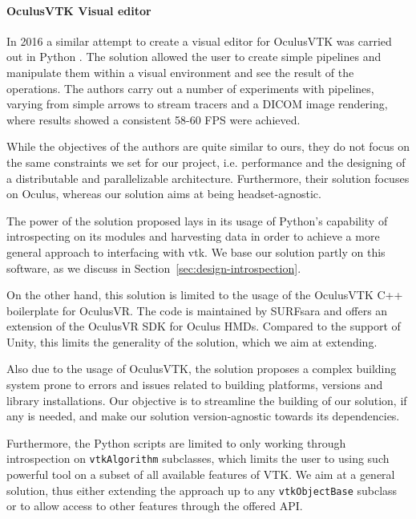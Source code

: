 \paragraph{OculusVTK Visual editor}

In 2016 a similar attempt to create a visual editor for OculusVTK was carried out in Python \cite{dreuning_visual_2016}. The solution allowed the user to create simple pipelines and manipulate them within a visual environment and see the result of the operations. The authors carry out a number of experiments with pipelines, varying from simple arrows to stream tracers and a DICOM image rendering, where results showed a consistent 58-60 FPS were achieved.

While the objectives of the authors are quite similar to ours, they do not focus on the same constraints we set for our project, i.e. performance and the designing of a distributable and parallelizable architecture. Furthermore, their solution focuses on Oculus, whereas our solution aims at being headset-agnostic.

The power of the solution proposed lays in its usage of Python's capability of introspecting on its modules and harvesting data in order to achieve a more general approach to interfacing with \acrshort{vtk}. We base our solution partly on this software, as we discuss in Section~\ref{sec:design-introspection}.

On the other hand, this solution is limited to the usage of the OculusVTK C++ boilerplate for OculusVR. The code is maintained by SURFsara and offers an extension of the OculusVR SDK for Oculus HMDs. Compared to the support of Unity, this limits the generality of the solution, which we aim at extending.

Also due to the usage of OculusVTK, the solution proposes a complex building system prone to errors and issues related to building platforms, versions and library installations. Our objective is to streamline the building of our solution, if any is needed, and make our solution version-agnostic towards its dependencies. 

Furthermore, the Python scripts are limited to only working through introspection on \verb|vtkAlgorithm| subclasses, which limits the user to using such powerful tool on a subset of all available features of VTK. We aim at a general solution, thus either extending the approach up to any \verb|vtkObjectBase| subclass or to allow access to other features through the offered API.

